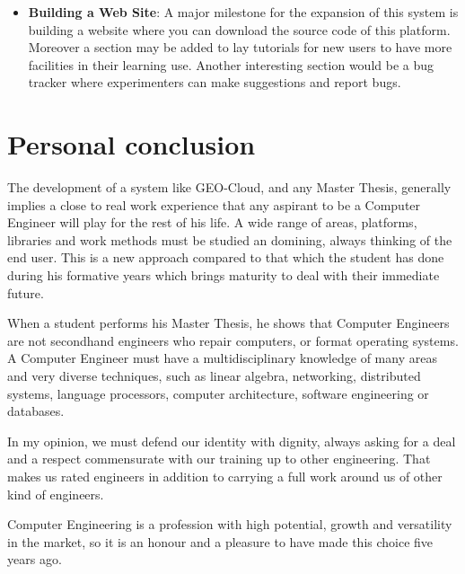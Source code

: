 \begin{itemize}
\item \textbf{Building a Web Site}: A major milestone for the expansion of this system
  is building a website where you can download the source code of this
  platform. Moreover a section may be added to lay tutorials for new users to have more facilities in their learning
  use. Another interesting section would be a bug tracker where experimenters can make
  suggestions and report bugs.

\end{itemize}

\section{Personal conclusion}

The development of a system like GEO-Cloud, and any Master Thesis, generally implies a close to real work experience that any aspirant to be a Computer
Engineer will play for the rest of his life. A wide range of areas, platforms,
libraries and work methods must be studied an domining, always
thinking of the end user. This is a new approach
compared to that which the student has done during his formative years which
brings maturity to deal with their immediate future.

When a student performs his Master Thesis, he shows that  Computer Engineers
are not secondhand engineers who repair computers, or format operating
systems. A Computer Engineer must have a multidisciplinary knowledge of many areas
and very diverse techniques, such as linear algebra, networking, distributed
systems, language processors,  computer architecture, software engineering or
databases. 

In my opinion, we must defend our identity with dignity, always asking for a deal and a respect commensurate with
our training up to other engineering. That makes us rated engineers  in
addition to carrying a full work around us of other kind of engineers. 

Computer Engineering is a profession with high potential, growth  and
versatility in the market, so it is an honour and a pleasure to have
made this choice five years ago.

